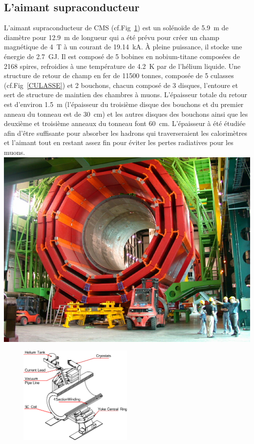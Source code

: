 \subsection{L'aimant supraconducteur}
\vspace*{-0.3cm}
L'aimant supraconducteur de CMS (cf.Fig~\ref{MAGNET}) est un solénoïde de \SI{5.9}{\meter} de diamètre pour \SI{12.9}{\meter} de longueur qui a été prévu pour créer un champ magnétique de \SI{4}{\tesla} à un courant de \SI{19.14}{\kilo\ampere}. À pleine puissance, il stocke une énergie de \SI{2.7}{\giga\joule}. Il est composé de \num{5} bobines en nobium-titane composées de \num{2168} spires, refroidies à une température de \SI{4.2}{\kelvin} par de l'hélium liquide. Une structure de retour de champ en fer de \num{11500} tonnes, composée de \num{5} culasses (cf.Fig~\ref{CULASSE}) et \num{2} bouchons, chacun composé de \num{3} disques, l'entoure et sert de structure de maintien des chambres à muons. L'épaisseur totale du retour est d'environ \SI{1.5}{\meter} (l'épaisseur du troisième disque des bouchons et du premier anneau du tonneau est de \SI{30}{\centi\meter}) et les autres disques des bouchons ainsi que les deuxième et troisième anneaux du tonneau font \SI{60}{\centi\meter}. L'épaisseur à été étudiée afin d'être suffisante pour absorber les hadrons qui traverseraient les calorimètres et l'aimant tout en restant assez fin pour éviter les pertes radiatives pour les muons.
\marginpar
{
	\centering
	\includegraphics[width=\marginparwidth]{CMS/CULASSE.jpg}
	\label{CULASSE}
}
\begin{figure}[ht!]
	\centering
	\includegraphics[width=0.50\textwidth]{CMS/MAGNET.png}
	\label{MAGNET}
\end{figure}
